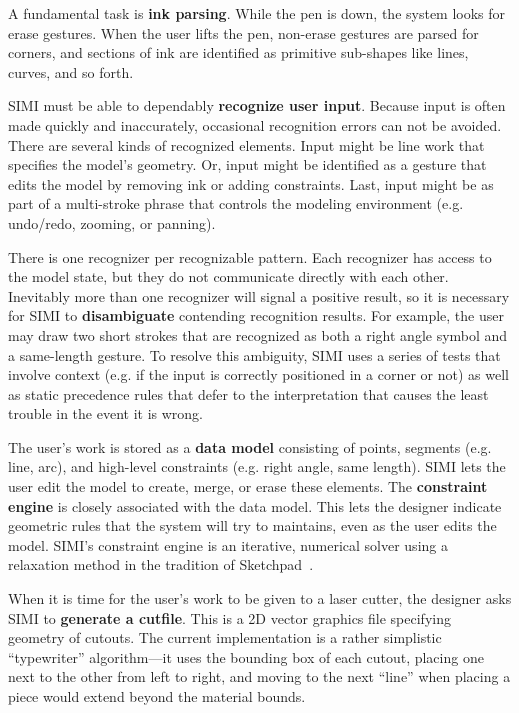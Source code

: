 A fundamental task is \textbf{ink parsing}. While the pen is down, the
system looks for erase gestures. When the user lifts the pen,
non-erase gestures are parsed for corners, and sections of ink are
identified as primitive sub-shapes like lines, curves, and so forth.

SIMI must be able to dependably \textbf{recognize user input}.
Because input is often made quickly and inaccurately, occasional
recognition errors can not be avoided. There are several kinds of
recognized elements. Input might be line work that specifies the
model's geometry. Or, input might be identified as a gesture that
edits the model by removing ink or adding constraints. Last, input
might be as part of a multi-stroke phrase that controls the modeling
environment (e.g. undo/redo, zooming, or panning).

There is one recognizer per recognizable pattern. Each recognizer has
access to the model state, but they do not communicate directly with
each other. Inevitably more than one recognizer will signal a positive
result, so it is necessary for SIMI to \textbf{disambiguate}
contending recognition results. For example, the user may draw two
short strokes that are recognized as both a right angle symbol and a
same-length gesture. To resolve this ambiguity, SIMI uses a series of
tests that involve context (e.g. if the input is correctly positioned
in a corner or not) as well as static precedence rules that defer to
the interpretation that causes the least trouble in the event it is
wrong.

The user's work is stored as a \textbf{data model} consisting of
points, segments (e.g. line, arc), and high-level constraints
(e.g. right angle, same length). SIMI lets the user edit the model to
create, merge, or erase these elements. The \textbf{constraint engine}
is closely associated with the data model. This lets the designer
indicate geometric rules that the system will try to maintains, even
as the user edits the model. SIMI's constraint engine is an iterative,
numerical solver using a relaxation method in the tradition of
Sketchpad~\cite{sutherland-sketchpad}.

When it is time for the user's work to be given to a laser cutter, the
designer asks SIMI to \textbf{generate a cutfile}. This is a 2D vector
graphics file specifying geometry of cutouts. The current
implementation is a rather simplistic ``typewriter'' algorithm---it
uses the bounding box of each cutout, placing one next to the other
from left to right, and moving to the next ``line'' when placing a
piece would extend beyond the material bounds.


